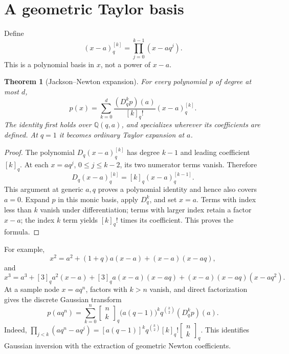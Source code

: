 \documentclass[11pt,a4paper,oneside,openany]{book}
\newtheorem{theorem}{Theorem}[chapter]
\theoremstyle{definition}
\theoremstyle{remark}
\newcommand{\Q}{\mathbb Q}
\newcommand{\GB}[3][q]{\begin{bmatrix}#2\\#3\end{bmatrix}_{#1}}
\newcommand{\qf}[2][q]{[#2]_{#1}!}
\begin{document}
\section{A geometric Taylor basis}
Define
\begin{equation}\label{q1:qcc:q-newton-basis}
 (x-a)_{q}^{[k]}=\prod_{j=0}^{k-1}(x-aq^j).
\end{equation}
This is a polynomial basis in \(x\), not a power of \(x-a\).
\begin{theorem}[Jackson--Newton expansion]\label{q1:qcc:q-taylor}
For every polynomial \(p\) of degree at most \(d\),
\begin{equation}\label{q1:qcc:q-taylor-formula}
 p(x)=\sum_{k=0}^d\frac{(D_q^kp)(a)}{\qf k}(x-a)_q^{[k]}.
\end{equation}
The identity first holds over \(\Q(q,a)\), and specializes wherever its
coefficients are defined. At \(q=1\) it becomes ordinary Taylor expansion at
\(a\).
\end{theorem}
\begin{proof}
The polynomial \(D_q(x-a)_q^{[k]}\) has degree \(k-1\) and leading coefficient
\([k]_q\). At each \(x=aq^j\), \(0\le j\le k-2\), its two numerator terms
vanish. Therefore
\[
 D_q(x-a)_q^{[k]}=[k]_q(x-a)_q^{[k-1]}.
\]
This argument at generic \(a,q\) proves a polynomial identity and hence also
covers \(a=0\). Expand \(p\) in this monic basis, apply \(D_q^k\), and set
\(x=a\). Terms with index less than \(k\) vanish under differentiation; terms
with larger index retain a factor \(x-a\); the index \(k\) term yields
\([k]_q!\) times its coefficient. This proves the formula.
\end{proof}
For example,
\[
 x^2=a^2+(1+q)a(x-a)+(x-a)(x-aq),
\]
and
\[
 x^3=a^3+[3]_qa^2(x-a)+[3]_qa(x-a)(x-aq)
                  +(x-a)(x-aq)(x-aq^2).
\]
At a sample node \(x=aq^n\), factors with \(k>n\) vanish, and direct
factorization gives the discrete Gaussian transform
\begin{equation}\label{q1:qcc:sample-transform}
 p(aq^n)=\sum_{k=0}^n\GB nk\bigl(a(q-1)\bigr)^k
                  q^{\binom k2}(D_q^kp)(a).
\end{equation}
Indeed,
\(\prod_{j<k}(aq^n-aq^j)
 =[a(q-1)]^kq^{\binom k2}[k]_q!\GB nk\).
This identifies Gaussian inversion with the extraction of geometric Newton
coefficients.
\end{document}
